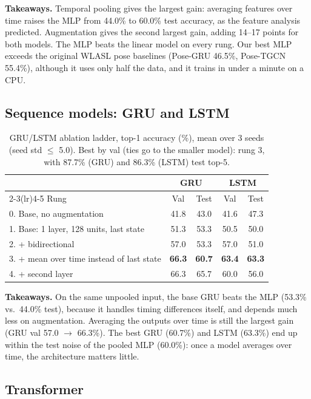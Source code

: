 \documentclass[10pt]{article}
\begin{document}
\textbf{Takeaways.} Temporal pooling gives the largest gain: averaging features over time raises the MLP from
44.0\% to 60.0\% test accuracy, as the feature analysis predicted. Augmentation gives the second largest gain,
adding 14--17 points for both models. The MLP beats the linear model on every rung. Our best MLP exceeds the original WLASL pose baselines (Pose-GRU 46.5\%, Pose-TGCN 55.4\%), although it
uses only half the data, and it trains in under a minute on a CPU.
\subsection{Sequence models: GRU and LSTM}\label{sec:rnn}

\begin{table}[h]
\centering\footnotesize
\begin{tabular}{lcccc}
\toprule
 & \multicolumn{2}{c}{GRU} & \multicolumn{2}{c}{LSTM} \\
\cmidrule(lr){2-3}\cmidrule(lr){4-5}
Rung & Val & Test & Val & Test \\
\midrule
0. Base, no augmentation & 41.8 & 43.0 & 41.6 & 47.3 \\
1. Base: 1 layer, 128 units, last state & 51.3 & 53.3 & 50.5 & 50.0 \\
2. + bidirectional & 57.0 & 53.3 & 57.0 & 51.0 \\
3. + mean over time instead of last state & \textbf{66.3} & \textbf{60.7} & \textbf{63.4} & \textbf{63.3} \\
4. + second layer & 66.3 & 65.7 & 60.0 & 56.0 \\
\bottomrule
\end{tabular}
\caption{GRU/LSTM ablation ladder, top-1 accuracy (\%), mean over 3 seeds (seed std $\le$ 5.0). Best by val
(ties go to the smaller model): rung 3, with 87.7\% (GRU) and 86.3\% (LSTM) test top-5.}
\label{tab:rnn}
\end{table}

\textbf{Takeaways.} On the same unpooled input, the base GRU beats the MLP (53.3\% vs.\ 44.0\% test), because it
handles timing differences itself, and depends much less on augmentation. Averaging
the outputs over time is still the largest gain (GRU val 57.0 $\to$ 66.3\%). The best GRU (60.7\%) and LSTM (63.3\%) end up within the test noise of the pooled MLP (60.0\%): once a model averages over time, the
architecture matters little.

\subsection{Transformer}\label{sec:transformer}
\end{document}
